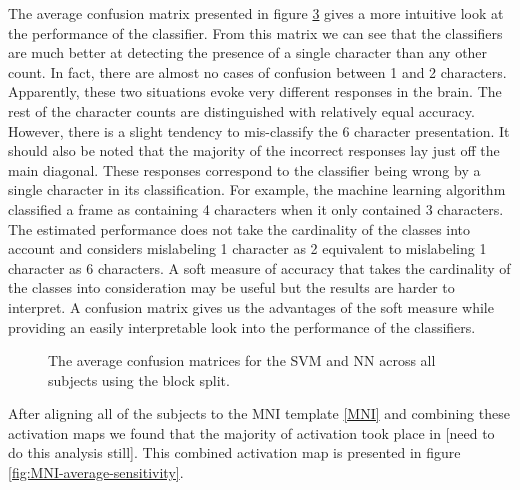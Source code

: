 \documentclass[preprint,5p,authoryear]{elsarticle}
\begin{document}
The average confusion matrix presented in figure \ref{fig:average-confusion} gives a more intuitive look at the performance of the classifier.
From this matrix we can see that the classifiers are much better at detecting the presence of a single character than any other count.
In fact, there are almost no cases of confusion between 1 and 2 characters.
Apparently, these two situations evoke very different responses in the brain.
The rest of the character counts are distinguished with relatively equal accuracy.
However, there is a slight tendency to mis-classify the 6 character presentation.
It should also be noted that the majority of the incorrect responses lay just off the main diagonal.
These responses correspond to the classifier being wrong by a single character in its classification.
For example, the machine learning algorithm classified a frame as containing 4 characters when it only contained 3 characters.
The estimated performance does not take the cardinality of the classes into account and considers mislabeling 1 character as 2 equivalent to mislabeling 1 character as 6 characters.
A soft measure of accuracy that takes the cardinality of the classes into consideration may be useful but the results are harder to interpret.
A confusion matrix gives us the advantages of the soft measure while providing an easily interpretable look into the performance of the classifiers.

\begin{figure}
\centering
\begin{subfigure}{0.45\textwidth}
\centering

\caption{}
\label{fig:average-confusion-svm}
\end{subfigure}
\begin{subfigure}{0.45\textwidth}
\centering

\caption{}
\label{fig:average-confusion-nn}
\end{subfigure}
\caption{The average confusion matrices for the  SVM and  NN across all subjects using the block split.}
\label{fig:average-confusion}
\end{figure}

After aligning all of the subjects to the MNI template \ref{MNI} and combining these activation maps we found that the majority of activation took place in [need to do this analysis still].
This combined activation map is presented in figure \ref{fig:MNI-average-sensitivity}.
\end{document}
